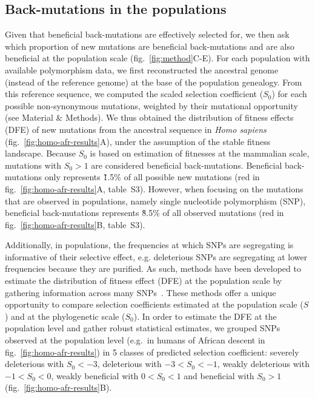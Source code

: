 \documentclass{article}
\newcommand{\Sphy}{S_{0}}
\newcommand{\divStrongDel}{\Sphy < -3}
\newcommand{\divDel}{-3 < \Sphy < -1}
\newcommand{\divWeakDel}{-1 < \Sphy < 0}
\newcommand{\divWeakAdv}{0 < \Sphy < 1}
\newcommand{\divAdv}{ \Sphy > 1}
\newcommand{\Spop}{S}
\begin{document}
    \subsection*{Back-mutations in the populations}
    Given that beneficial back-mutations are effectively selected for, we then ask which proportion of new mutations are beneficial back-mutations and are also beneficial at the population scale (fig.~\ref{fig:method}C-E).
    For each population with available polymorphism data, we first reconstructed the ancestral genome (instead of the reference genome) at the base of the population genealogy.
    From this reference sequence, we computed the scaled selection coefficient ($\Sphy$) for each possible non-synonymous mutations, weighted by their mutational opportunity (see Material \& Methods).
    We thus obtained the distribution of fitness effects (DFE) of new mutations from the ancestral sequence in \textit{Homo sapiens} (fig.~\ref{fig:homo-afr-results}A), under the assumption of the stable fitness landscape.
    Because $\Sphy$ is based on estimation of fitnesses at the mammalian scale, mutations with $\Sphy>1$ are considered beneficial back-mutations.
    Beneficial back-mutations only represents \~1.5\% of all possible new mutations (red in fig.~\ref{fig:homo-afr-results}A, table~S3).
    However, when focusing on the mutations that are observed in populations, namely single nucleotide polymorphism (SNP), beneficial back-mutations represents \~8.5\% of all observed mutations (red in fig.~\ref{fig:homo-afr-results}B, table~S3).

    Additionally, in populations, the frequencies at which SNPs are segregating is informative of their selective effect, e.g. deleterious SNPs are segregating at lower frequencies because they are purified.
    As such, methods have been developed to estimate the distribution of fitness effect (DFE) at the population scale by gathering information across many SNPs~\cite{eyre-walker_distribution_2006a, eyre-walker_estimating_2009a, galtier_adaptive_2016, tataru_inference_2017}.
    These methods offer a unique opportunity to compare selection coefficients estimated at the population scale ($\Spop$) and at the phylogenetic scale ($\Sphy$).
    In order to estimate the DFE at the population level and gather robust statistical estimates, we grouped SNPs observed at the population level (e.g.~in humans of African descent in fig.~\ref{fig:homo-afr-results}) in 5 classes of predicted selection coefficient: severely deleterious with $\divStrongDel$, deleterious with $\divDel$, weakly deleterious with $\divWeakDel$, weakly beneficial with $\divWeakAdv$ and beneficial with $\divAdv$ (fig.~\ref{fig:homo-afr-results}B).
\end{document}
